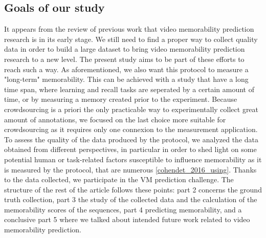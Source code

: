 \documentclass[sigconf]{acmart}
\begin{document}
\subsection{Goals of our study}
It appears from the review of previous work that video memorability prediction research is in its early stage.
We still need to find a proper way to collect quality data in order to build a large dataset to bring video memorability prediction research to a new level.
The present study aims to be part of these efforts to reach such a way.
As aforementioned, we also want this protocol to measure a "long-term" memorability.
This can be achieved with a study that have a long time span, where learning and recall tasks are seperated by a certain amount of time, or by measuring a memory created prior to the experiment.
Because crowdsourcing is a priori the only practicable way to experimentally collect great amount of annotations, we focused on the last choice more suitable for crowdsourcing as it requires only one connexion to the measurement application.
To assess the quality of the data produced by the protocol, we analyzed the data obtained from different perspectives, in particular in order to shed light on some potential human or task-related factors susceptible to influence memorability as it is measured by the protocol, that are numerous \ref{cohendet_2016_using}.
Thanks to the data collected, we participate in the VM prediction challenge.
The structure of the rest of the article follows these points: part 2 concerns the ground truth collection, part 3 the study of the collected data and the calculation of the memorability scores of the sequences, part 4 predicting memorability, and a conclusive part 5 where we talked about intended future work related to video memorability prediction.

\end{document}

